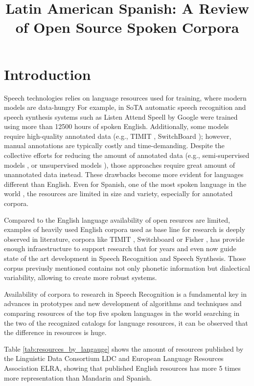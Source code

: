 \documentclass[10pt, a4paper]{article}
\title{Latin American Spanish: A Review of Open Source Spoken Corpora}
\begin{document}
\maketitleabstract


\section{Introduction}

Speech technologies relies on language resources used for training, where modern models are data-hungry For example, in SoTA automatic speech recognition and speech synthesis  systems such as Listen Attend Speell by Google \cite{Chiu2018} were trained using more than 12500 hours of spoken English. Additionally, some models require high-quality annotated data (e.g., TIMIT \cite{TIMIT}, SwitchBoard \cite{Switchboard}); however, manual annotations are typically costly and time-demanding. Despite the collective efforts for reducing the amount of annotated data (e.g., semi-supervised models \cite{AmazonSemiSupervised}, or unsupervised models \cite{ZeroResources}), those approaches require great amount of unannotated data instead. These drawbacks become more evident for languages different than English. Even for Spanish, one of the most spoken language in the world \cite{HernndezMena2017}, the resources are limited in size and variety, especially for annotated corpora.

Compared to the English language availability of open resurces are limited, examples of heavily used English corpora used as base line for research is deeply observed in literature, corpora like TIMIT \cite{TIMIT}, Switchboard \cite{Switchboard} or Fisher \cite{Fisher}, has provide enough infraestructure to support research that for years and even now guide state of the art development in Speech Recognition and Speech Synthesis. Those corpus previusly mentioned contains not only phonetic information but dialectical variability, allowing to create more robust systems.

Availability of corpora to research in Speech Recognition is a fundamental key in advances in prototypes and new development of algorithms and techniques and comparing resources of the top five spoken languages in the world searching in the two of the recognized catalogs for language resources, it can be observed that the difference in resources is huge. 

Table \ref{tab:resources_by_langauge} shows the amount of resources published by the Linguistic Data Consortium LDC and European Language Resources Association ELRA, showing that published English resources has more 5 times more representation than Mandarin and Spanish.
\end{document}
